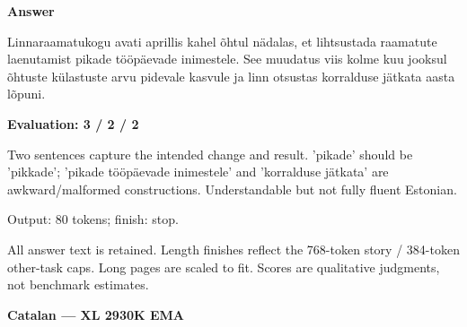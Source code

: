 \documentclass[10pt]{article}
\begin{document}
{\begin{minipage}{\textwidth}
\textbf{Answer}\par Linnaraamatukogu avati aprillis kahel õhtul nädalas, et lihtsustada raamatute laenutamist pikade tööpäevade inimestele. See muudatus viis kolme kuu jooksul õhtuste külastuste arvu pidevale kasvule ja linn otsustas korralduse jätkata aasta lõpuni.\par\smallskip
\textbf{Evaluation: 3 / 2 / 2}\par Two sentences capture the intended change and result. 'pikade' should be 'pikkade'; 'pikade tööpäevade inimestele' and 'korralduse jätkata' are awkward/malformed constructions. Understandable but not fully fluent Estonian.
\par {\color{gray} Output: 80 tokens; finish: stop.}\par
\medskip\footnotesize All answer text is retained. Length finishes reflect the 768-token story / 384-token other-task caps. Long pages are scaled to fit. Scores are qualitative judgments, not benchmark estimates.
\end{minipage}}%
\noindent\ifdim\dimexpr\ht\languagepage+\dp\languagepage\relax>0.93\textheight%
\resizebox*{!}{0.93\textheight}{\usebox{\languagepage}}%
\else\usebox{\languagepage}\fi%
\clearpage
{\Large\bfseries Catalan --- XL 2930K EMA}\par\smallskip
\end{document}
